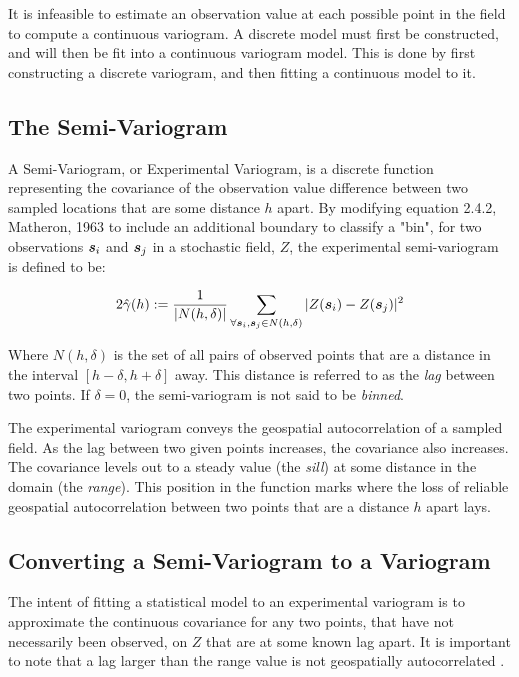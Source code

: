 \documentclass[11pt]{ucthesis}
\newcommand{\vect}[1]{{\it{\boldsymbol{#1}}}}
\begin{document}
It is infeasible to estimate an observation value at each possible point in the field to compute a continuous variogram. A discrete model must first be constructed, and will then be fit into a continuous variogram model. This is done by first constructing a discrete variogram, and then fitting a continuous model to it.

\subsection{The Semi-Variogram}
A Semi-Variogram, or Experimental Variogram, is a discrete function representing the covariance of the observation value difference between two sampled locations that are some distance $h$ apart. By modifying equation 2.4.2, Matheron, 1963 \cite{matheron:geostat} to include an additional boundary to classify a "bin", for two observations $\vect{s}_{i}$ and $\vect{s}_{j}$ in a stochastic field, $Z$, the experimental semi-variogram is defined to be:

\begin{equation} 
    \label{eq:exp_var}
    2\hat{\gamma}(h) := \frac{1}{|N(h,\delta)|}\sum\limits_{\forall \vect{s}_i,\vect{s}_j \in N(h, \delta)}|Z(\vect{s}_i) - Z(\vect{s}_j)|^2 %
\end{equation}

Where $N(h,\delta)$ is the set of all pairs of observed points that are a distance in the interval $[h-\delta, h+\delta]$ away. This distance is referred to as the \textit{lag} between two points. If $\delta = 0$, the semi-variogram is not said to be \textit{binned}.

The experimental variogram conveys the geospatial autocorrelation of a sampled field. As the lag between two given points increases, the covariance also increases. The covariance levels out to a steady value (the \textit{sill}) at some distance in the domain (the \textit{range}). This position in the function marks where the loss of reliable geospatial autocorrelation between two points that are a distance $h$ apart lays.

\subsection{Converting a Semi-Variogram to a Variogram} \label{sec:semitovar}
The intent of fitting a statistical model to an experimental variogram is to approximate the continuous covariance for any two points, that have not necessarily been observed, on $Z$ that are at some known lag apart. It is important to note that a lag larger than the range value is not geospatially autocorrelated \cite{felus:srn}. 
\end{document}
